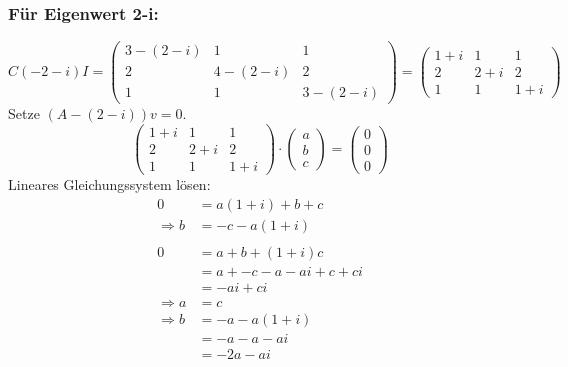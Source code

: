 \documentclass{article} %
\begin{document}
\subsubsection*{Für Eigenwert 2-i:}
\[
C  (-2-i) I = \begin{pmatrix}
3-(2-i)&1&1\\
2&4-(2-i)&2\\
1&1&3-(2-i)
\end{pmatrix}
 = \begin{pmatrix}
1+i&1&1\\
2&2+i&2\\
1&1&1+i
\end{pmatrix}
\]
Setze $(A -(2-i) )v = 0$.
\[
\begin{pmatrix}
1+i&1&1\\
2&2+i&2\\
1&1&1+i
\end{pmatrix} \cdot \begin{pmatrix}
a \\ b\\c
\end{pmatrix} = \begin{pmatrix}
0\\0\\0
\end{pmatrix}
\]
Lineares Gleichungssystem lösen:
\begin{align*}
            0 & = a(1+i) +b+c \\
\Rightarrow b & = -c -a(1+i) \\ \\ 
            0 & = a + b + (1+i)c \\
              & = a + -c -a -ai  + c+ ci \\
              & = -ai + ci \\
\Rightarrow a & = c \\
\Rightarrow b & = -a -a(1+i) \\
              & = -a -a -ai \\
              & = -2a -ai
\end{align*}
\end{document}
